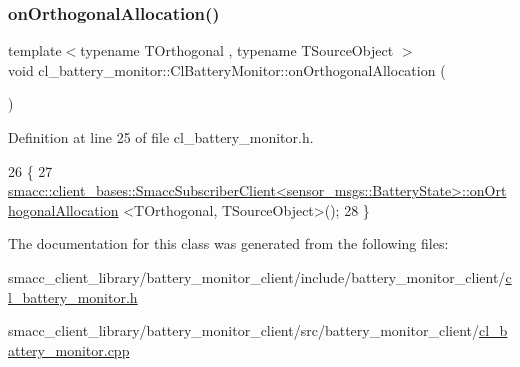 \subsubsection{\texorpdfstring{on\+Orthogonal\+Allocation()}{onOrthogonalAllocation()}}
{\footnotesize\ttfamily template$<$typename T\+Orthogonal , typename T\+Source\+Object $>$ \\
void cl\+\_\+battery\+\_\+monitor\+::\+Cl\+Battery\+Monitor\+::on\+Orthogonal\+Allocation (\begin{DoxyParamCaption}{ }\end{DoxyParamCaption})\hspace{0.3cm}{\ttfamily [inline]}}



Definition at line 25 of file cl\+\_\+battery\+\_\+monitor.\+h.


\begin{DoxyCode}
26     \{
27         
      \hyperlink{classsmacc_1_1client__bases_1_1SmaccSubscriberClient}{smacc::client\_bases::SmaccSubscriberClient<sensor\_msgs::BatteryState>::onOrthogonalAllocation}
      <TOrthogonal, TSourceObject>();
28     \}
\end{DoxyCode}


The documentation for this class was generated from the following files\+:\begin{DoxyCompactItemize}
\item 
smacc\+\_\+client\+\_\+library/battery\+\_\+monitor\+\_\+client/include/battery\+\_\+monitor\+\_\+client/\hyperlink{cl__battery__monitor_8h}{cl\+\_\+battery\+\_\+monitor.\+h}\item 
smacc\+\_\+client\+\_\+library/battery\+\_\+monitor\+\_\+client/src/battery\+\_\+monitor\+\_\+client/\hyperlink{cl__battery__monitor_8cpp}{cl\+\_\+battery\+\_\+monitor.\+cpp}\end{DoxyCompactItemize}
